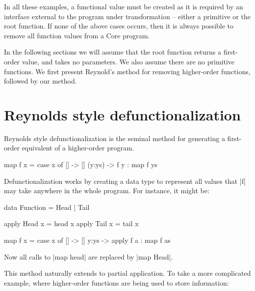 \documentclass[preprint]{sigplanconf}
\begin{document}
In all these examples, a functional value must be created as it is required by an interface external to the program under transformation -- either a primitive or the root function. If none of the above cases occurs, then it is always possible to remove all function values from a Core program.

In the following sections we will assume that the root function returns a first-order value, and takes no parameters. We also assume there are no primitive functions. We first present Reynold's method for removing higher-order functions, followed by our method.

\section{Reynolds style defunctionalization}

Reynolds style defunctionalization \cite{reynolds:defunc} is the seminal method for generating a first-order equivalent of a higher-order program.

\begin{example}
\begin{code}
map f x = case  x of
                []      -> []
                (y:ys)  -> f y : map f ys
\end{code}

\noindent Defunctionalization works by creating a data type to represent all values that |f| may take anywhere in the whole program. For instance, it might be:

\begin{code}
data Function = Head | Tail

apply Head  x = head  x
apply Tail  x = tail  x

map f x = case  x of
                []    -> []
                y:ys  -> apply f a : map f as
\end{code}

\noindent Now all calls to |map head| are replaced by |map Head|.
\end{example}

This method naturally extends to partial application. To take a more complicated example, where higher-order functions are being used to store information:
\end{document}
